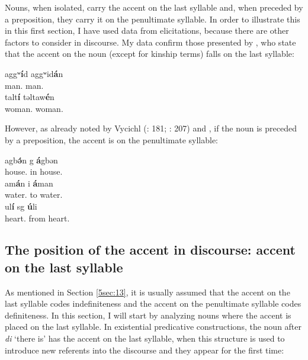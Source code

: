 \documentclass[output=paper]{langsci/langscibook}
\begin{document}
Nouns, when isolated, carry the accent on the last syllable and, when preceded by a preposition, they carry it on the penultimate syllable. In order to illustrate this in this first section, I have used data from elicitations, because there are other factors to consider in discourse. My data confirm those presented by \cite{louali:philippson:05}, who state that the accent on the noun (except for kinship terms) falls on the last syllable:

\begin{exe}
\ex\label{5ex:1}
\gll	aggʷ{\bf{í}}d		\hspace*{1.4cm} aggʷid{\bf{á}}n \\
	man.{}		{} man.{} \\
\glt
\ex\label{5ex:2}
\gll	talt{\bf{í}}			\hspace*{1cm} təltaw{\bf{é}}n \\
	woman.{}	{} woman.{} \\
\glt
\end{exe}

However, as already noted by Vycichl (\citeyear{vycichl:81}: 181; \citeyear{vycichl:05}: 207) and \cite[][12]{louali:philippson:05}, if the noun is preceded by a preposition, the accent is on the penultimate syllable:

\begin{exe}
\ex\label{5ex:3}
\gll	agb{\bf{ə́}}n		\hspace*{0.95cm}	g 	{\bf{á}}gbən \\
	house.{}	{} in 	house.{} \\
\glt
\ex\label{5ex:4}
\gll	am{\bf{á}}n		\hspace*{1cm}	i	{\bf{á}}man \\
	water.{}	{} to 	water.{} \\
\glt
\ex\label{5ex:4}		
\gll	ul{\bf{í}}			\hspace*{1cm}	sg 	{\bf{ú}}li \\
	heart.{}	{} from	heart.{} \\
\glt
\end{exe}


\subsection{The position of the accent in discourse: accent on the last syllable}\label{5sec:22}

As mentioned in Section \ref{5sec:13}, it is usually assumed that the accent on the last syllable codes indefiniteness and the accent on the penultimate syllable codes definiteness. In this section, I will start by analyzing nouns where the accent is placed on the last syllable. In existential predicative constructions, the noun after {\emph{di}} `there is' has the accent on the last syllable, when this structure is used to introduce new referents into the discourse and they appear for the first time:
\end{document}

